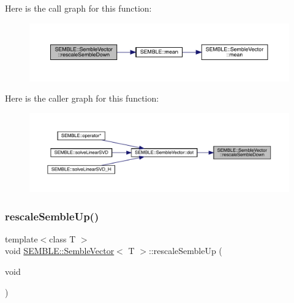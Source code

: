 Here is the call graph for this function\+:
\nopagebreak
\begin{figure}[H]
\begin{center}
\leavevmode
\includegraphics[width=350pt]{d9/d94/structSEMBLE_1_1SembleVector_a749affd5efb20a00291f27bf034728cd_cgraph}
\end{center}
\end{figure}
Here is the caller graph for this function\+:
\nopagebreak
\begin{figure}[H]
\begin{center}
\leavevmode
\includegraphics[width=350pt]{d9/d94/structSEMBLE_1_1SembleVector_a749affd5efb20a00291f27bf034728cd_icgraph}
\end{center}
\end{figure}
\mbox{\label{structSEMBLE_1_1SembleVector_aa9fbae5c5028eb49709043362099cb03}} 
\subsubsection{\texorpdfstring{rescaleSembleUp()}{rescaleSembleUp()}\hspace{0.1cm}{\footnotesize\ttfamily [1/2]}}
{\footnotesize\ttfamily template$<$class T $>$ \\
void \mbox{\hyperlink{structSEMBLE_1_1SembleVector}{S\+E\+M\+B\+L\+E\+::\+Semble\+Vector}}$<$ T $>$\+::rescale\+Semble\+Up (\begin{DoxyParamCaption}\item[{void}]{ }\end{DoxyParamCaption})}

